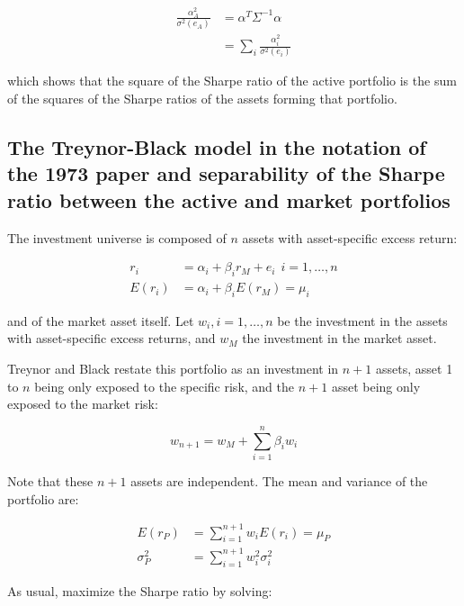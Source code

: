 \documentclass[
  11pt,
]{article}
\begin{document}
\begin{align*}
\frac{\alpha^2_A}{\sigma^2(e_A)} &= \alpha^T \Sigma^{-1} \alpha \\
&= \sum_i \frac{\alpha^2_i}{\sigma^2(e_i)}
\label{eq:sep-2}
\end{align*}

which shows that the square of the Sharpe ratio of the active portfolio
is the sum of the squares of the Sharpe ratios of the assets forming
that portfolio.

\hypertarget{the-treynor-black-model-in-the-notation-of-the-1973-paper-and-separability-of-the-sharpe-ratio-between-the-active-and-market-portfolios}{%
\subsection{The Treynor-Black model in the notation of the 1973 paper
and separability of the Sharpe ratio between the active and market
portfolios}\label{the-treynor-black-model-in-the-notation-of-the-1973-paper-and-separability-of-the-sharpe-ratio-between-the-active-and-market-portfolios}}

The investment universe is composed of \(n\) assets with asset-specific
excess return:

\begin{align}
r_i &= \alpha_i + \beta_i r_M + e_i \ \ i=1, \ldots, n \\
E(r_i) &= \alpha_i + \beta_i E(r_M) = \mu_i
\label{eq:treynor-black-1}
\end{align}

and of the market asset itself. Let \(w_i, i=1, \ldots, n\) be the
investment in the assets with asset-specific excess returns, and \(w_M\)
the investment in the market asset.

Treynor and Black restate this portfolio as an investment in \(n+1\)
assets, asset 1 to \(n\) being only exposed to the specific risk, and
the \(n+1\) asset being only exposed to the market risk:

\[
w_{n+1} = w_M + \sum_{i=1}^n \beta_i w_i
\]

Note that these \(n+1\) assets are independent. The mean and variance of
the portfolio are:

\begin{align}
E(r_P) &= \sum_{i=1}^{n+1} w_i E(r_i) = \mu_P \\
\sigma^2_P &= \sum_{i=1}^{n+1} w^2_i \sigma^2_i
\end{align}

As usual, maximize the Sharpe ratio by solving:
\end{document}
